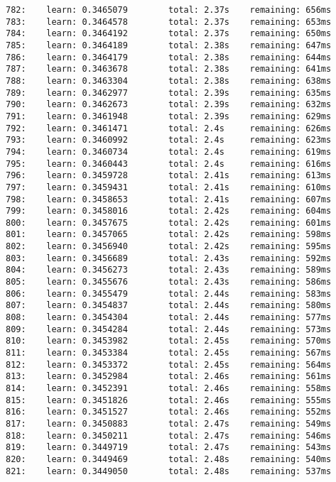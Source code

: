 \documentclass[11pt]{article}
\begin{document}
\begin{Verbatim}[commandchars=\\\{\}]
782:    learn: 0.3465079        total: 2.37s    remaining: 656ms
783:    learn: 0.3464578        total: 2.37s    remaining: 653ms
784:    learn: 0.3464192        total: 2.37s    remaining: 650ms
785:    learn: 0.3464189        total: 2.38s    remaining: 647ms
786:    learn: 0.3464179        total: 2.38s    remaining: 644ms
787:    learn: 0.3463678        total: 2.38s    remaining: 641ms
788:    learn: 0.3463304        total: 2.38s    remaining: 638ms
789:    learn: 0.3462977        total: 2.39s    remaining: 635ms
790:    learn: 0.3462673        total: 2.39s    remaining: 632ms
791:    learn: 0.3461948        total: 2.39s    remaining: 629ms
792:    learn: 0.3461471        total: 2.4s     remaining: 626ms
793:    learn: 0.3460992        total: 2.4s     remaining: 623ms
794:    learn: 0.3460734        total: 2.4s     remaining: 619ms
795:    learn: 0.3460443        total: 2.4s     remaining: 616ms
796:    learn: 0.3459728        total: 2.41s    remaining: 613ms
797:    learn: 0.3459431        total: 2.41s    remaining: 610ms
798:    learn: 0.3458653        total: 2.41s    remaining: 607ms
799:    learn: 0.3458016        total: 2.42s    remaining: 604ms
800:    learn: 0.3457675        total: 2.42s    remaining: 601ms
801:    learn: 0.3457065        total: 2.42s    remaining: 598ms
802:    learn: 0.3456940        total: 2.42s    remaining: 595ms
803:    learn: 0.3456689        total: 2.43s    remaining: 592ms
804:    learn: 0.3456273        total: 2.43s    remaining: 589ms
805:    learn: 0.3455676        total: 2.43s    remaining: 586ms
806:    learn: 0.3455479        total: 2.44s    remaining: 583ms
807:    learn: 0.3454837        total: 2.44s    remaining: 580ms
808:    learn: 0.3454304        total: 2.44s    remaining: 577ms
809:    learn: 0.3454284        total: 2.44s    remaining: 573ms
810:    learn: 0.3453982        total: 2.45s    remaining: 570ms
811:    learn: 0.3453384        total: 2.45s    remaining: 567ms
812:    learn: 0.3453372        total: 2.45s    remaining: 564ms
813:    learn: 0.3452984        total: 2.46s    remaining: 561ms
814:    learn: 0.3452391        total: 2.46s    remaining: 558ms
815:    learn: 0.3451826        total: 2.46s    remaining: 555ms
816:    learn: 0.3451527        total: 2.46s    remaining: 552ms
817:    learn: 0.3450883        total: 2.47s    remaining: 549ms
818:    learn: 0.3450211        total: 2.47s    remaining: 546ms
819:    learn: 0.3449719        total: 2.47s    remaining: 543ms
820:    learn: 0.3449469        total: 2.48s    remaining: 540ms
821:    learn: 0.3449050        total: 2.48s    remaining: 537ms

\end{Verbatim}
\end{document}
